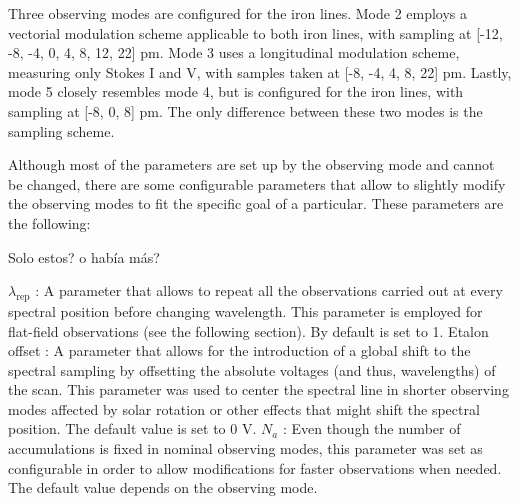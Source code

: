 Three observing modes are configured for the iron lines. Mode 2 employs a vectorial modulation scheme applicable to both iron lines, with sampling at [-12, -8, -4, 0, 4, 8, 12, 22] pm. Mode 3 uses a longitudinal modulation scheme, measuring only Stokes I and V, with samples taken at [-8, -4, 4, 8, 22] pm. Lastly, mode 5 closely resembles mode 4, but is configured for the iron lines, with sampling at [-8, 0, 8] pm. The only difference between these two modes is the sampling scheme.

Although most of the parameters are set up by the observing mode and cannot be changed, there are some configurable parameters that allow to slightly modify the observing modes to fit the specific goal of a particular. These parameters are the following:

Solo estos? o había más? 
\begin{itemize}
    \Myitem $\lambda _ {\text{rep}}$ : A parameter that allows to repeat all the observations carried out at every spectral position before changing wavelength. This parameter is employed for flat-field observations (see the following section). By default is set to 1.
    \Myitem Etalon offset : A parameter that allows for the introduction of a global shift to the spectral sampling by offsetting the absolute voltages (and thus, wavelengths) of the scan. This parameter was used to center the spectral line in shorter observing modes affected by solar rotation or other effects that might shift the spectral position. The default value is set to 0 V.
    \Myitem $N_a$ : Even though the number of accumulations is fixed in nominal observing modes, this parameter was set as configurable in order to allow modifications for faster observations when needed. The  default value depends on the observing mode.  
\end{itemize}



